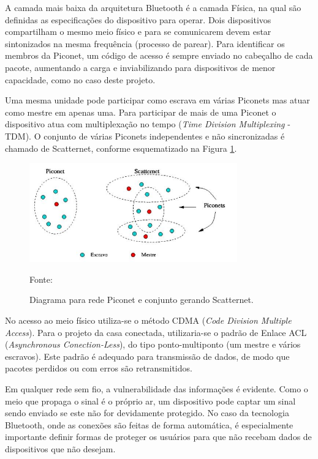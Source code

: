 A camada mais baixa da arquitetura Bluetooth é a camada Física, na qual são definidas as especificações do dispositivo para operar. Dois dispositivos compartilham o mesmo meio físico e para se comunicarem devem estar sintonizados na mesma frequência (processo de parear). Para identificar os membros da Piconet, um código de acesso é sempre enviado no cabeçalho de cada pacote, aumentando a carga e inviabilizando para dispositivos de menor capacidade, como no caso deste projeto. 

Uma mesma unidade pode participar como escrava em várias Piconets mas atuar como mestre em apenas uma. Para participar de mais de uma Piconet o dispositivo atua com multiplexação no tempo (\textit{Time Division Multiplexing} - TDM). O conjunto de várias Piconets independentes e não sincronizadas é chamado de Scatternet, conforme esquematizado na Figura \ref{fig:redesbluetooth}.

\begin{figure}[h]
	\centering
	\caption{Diagrama para rede Piconet e conjunto gerando Scatternet.}
  \includegraphics[width=0.8\textwidth]{imagens/redesbluetooth.jpg}
  \label{fig:redesbluetooth}
  
  Fonte: \cite{redesbluetooth}
\end{figure}

No acesso ao meio físico utiliza-se o método CDMA (\textit{Code Division Multiple Access}). Para o projeto da casa conectada, utilizaria-se o padrão de Enlace ACL (\textit{Asynchronous Conection-Less}), do tipo ponto-multiponto (um mestre e vários escravos). Este padrão é adequado para transmissão de dados, de modo que pacotes perdidos ou com erros são retransmitidos. 

Em qualquer rede sem fio, a vulnerabilidade das informações é evidente. Como o meio que propaga o sinal é o próprio ar, um dispositivo pode captar um sinal sendo enviado se este não for devidamente protegido. No caso da tecnologia Bluetooth, onde as conexões são feitas de forma automática, é especialmente importante definir formas de proteger os usuários para que não recebam dados de dispositivos que não desejam.

